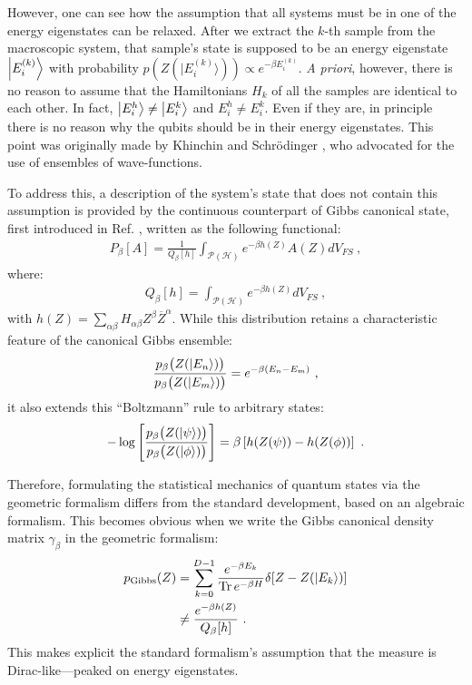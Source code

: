 \documentclass[draft,nofootinbib,pre,twocolumn,showpacs,showkeys,groupaddress,preprintnumbers,floatfix]{revtex4-1}
\newcommand{\1}{\mathbbm{1}}
\newcommand{\intP}{\int_{\mathcal{P}(\mathcal{H})} \!\!\!\!\!\!\!\!\!}
\begin{document}
However, one can see how the assumption that all systems must be in
one of the energy eigenstates can be relaxed. After we extract the
$k$-th sample from the macroscopic system, that sample's state is supposed to
be an energy eigenstate $\ket{E_i^{(k)}}$ with probability $p(Z(\vert E_i^{(k)}
\rangle)) \propto e^{-\beta E_i^{(k)}}$. \emph{A priori}, however, there is no 
reason to assume that the Hamiltonians $H_k$ of all the samples are identical 
to each other. In fact, $\ket{E_i^h}\neq \ket{E_i^k}$ and $E_i^h \neq E_i^k$.
Even if they are, in principle there is no reason why the qubits should be in 
their energy eigenstates. This point was originally made by Khinchin \cite{Khin51} and Schr\"odinger
\cite{Sch52}, who advocated for the use of ensembles of wave-functions.

To address this, a description of the system's state that does not contain this 
assumption is provided by the continuous counterpart of Gibbs canonical state,
first introduced in Ref. \cite{Brody1998}, written as the following functional:
\begin{align*}
P_\beta [A] = \frac{1}{Q_\beta[h]}\intP  e^{-\beta h(Z)} A(Z)dV_{FS}
  ~,
\end{align*}
where:
\begin{align*}
Q_\beta[h] = \intP e^{-\beta h(Z)} dV_{FS}
  ~,
\end{align*}
with $h(Z) = \sum_{\alpha \beta} H_{\alpha \beta} Z^\beta \overline{Z}^\alpha$.
While this distribution retains a characteristic feature of the canonical Gibbs 
ensemble:
\begin{align*}
\frac{p_\beta \big(Z(\ket{E_n}) \big)}{p_\beta \big(Z(\ket{E_m})\big)}
  = e^{-\beta(E_n - E_m)}
  ~,
\end{align*}
it also extends this ``Boltzmann'' rule to arbitrary states:
\begin{align*}
- \log  \left[\frac{p_\beta \big(Z(\ket{\psi}) \big) }{p_\beta
  \big(Z(\ket{\phi})\big)} \right]
  = \beta \left[ h(Z(\psi))-h(Z(\phi)) \right]
  ~.
\end{align*}

Therefore, formulating the statistical mechanics of quantum states via the
geometric formalism differs from the standard development, based on an
algebraic formalism. This becomes obvious when we write the Gibbs canonical
density matrix $\gamma_\beta$ in the geometric formalism:
\begin{align*}
p_{\mathrm{Gibbs}}(Z)
  & = \sum_{k=0}^{D-1} \frac{e^{-\beta E_k}}{\Tr e^{-\beta H}}
  \delta [Z - Z(\ket{E_k})] \\
  & \neq \frac{e^{-\beta h(Z)}}{Q_\beta[h]}
  ~.
\end{align*}
This makes explicit the standard formalism's assumption that the measure is
Dirac-like---peaked on energy eigenstates.
\end{document}
